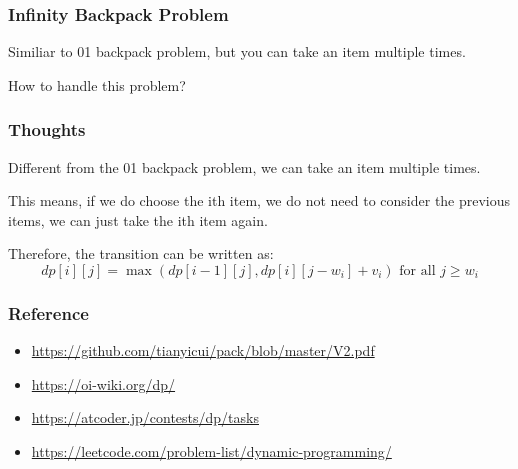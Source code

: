 \documentclass[xcolor=dvipsnames]{beamer}
\begin{document}
    \begin{frame}
        \frametitle{Infinity Backpack Problem}
        Similiar to 01 backpack problem, but you can take an item multiple times.

        How to handle this problem?
    \end{frame}

    \begin{frame}
        \frametitle{Thoughts}
        Different from the 01 backpack problem, we can take an item multiple times.

        This means, if we do choose the ith item, we do not need to consider the previous items, we can just take the ith item again.

        Therefore, the transition can be written as:
        $$ dp[i][j] = \max(dp[i-1][j], dp[i][j-w_i] + v_i) \text{ for all } j \geq w_i $$
        
    \end{frame}

    \begin{frame}
        \frametitle{Reference}
        \begin{itemize}
            \item \url{https://github.com/tianyicui/pack/blob/master/V2.pdf}
            \item \url{https://oi-wiki.org/dp/}
            \item \url{https://atcoder.jp/contests/dp/tasks}
            \item \url{https://leetcode.com/problem-list/dynamic-programming/}
            
            
        \end{itemize}
    \end{frame}
\end{document}
